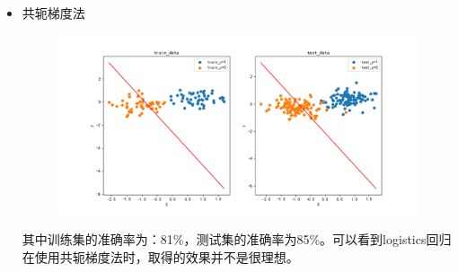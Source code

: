 \documentclass[lang=cn,a4paper,cite=authoryear]{elegantpaper}
\begin{document}
\begin{itemize}
	\par
	\item 共轭梯度法
	\begin{center}
		\begin{figure}[H]
			\centering
			\includegraphics[scale=0.5]{gctest03}
		\end{figure}
	\end{center}
	其中训练集的准确率为：81\%，测试集的准确率为85\%。可以看到logistics回归在使用共轭梯度法时，取得的效果并不是很理想。
\end{itemize}
\end{document}

